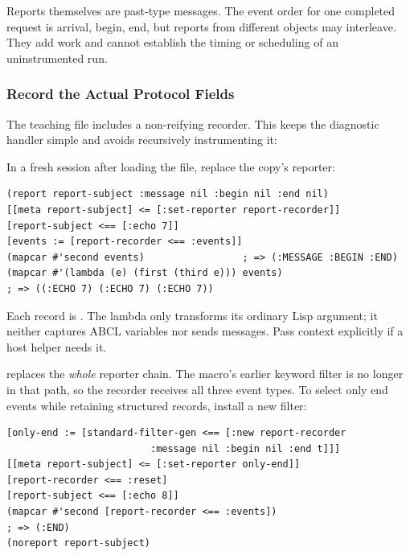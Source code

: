 Reports themselves are past-type messages. The event order for one
completed request is arrival, begin, end, but reports from different
objects may interleave. They add work and cannot establish the timing
or scheduling of an uninstrumented run.

\subsubsection{Record the Actual Protocol Fields}

The teaching file includes a non-reifying recorder. This keeps the
diagnostic handler simple and avoids recursively instrumenting it:


In a fresh session after loading the file, replace the copy's reporter:

\begin{codeblock}
\begin{lstlisting}
(report report-subject :message nil :begin nil :end nil)
[[meta report-subject] <= [:set-reporter report-recorder]]
[report-subject <== [:echo 7]]
[events := [report-recorder <== :events]]
(mapcar #'second events)                 ; => (:MESSAGE :BEGIN :END)
(mapcar #'(lambda (e) (first (third e))) events)
; => ((:ECHO 7) (:ECHO 7) (:ECHO 7))
\end{lstlisting}
\end{codeblock}

Each record is . The lambda only transforms
its ordinary Lisp argument; it neither captures ABCL variables nor sends
messages. Pass context explicitly if a host helper needs it.

 replaces the \emph{whole} reporter chain. The macro's
earlier keyword filter is no longer in that path, so the recorder receives
all three event types. To select only end events while retaining structured
records, install a new filter:

\begin{codeblock}
\begin{lstlisting}
[only-end := [standard-filter-gen <== [:new report-recorder
                         :message nil :begin nil :end t]]]
[[meta report-subject] <= [:set-reporter only-end]]
[report-recorder <== :reset]
[report-subject <== [:echo 8]]
(mapcar #'second [report-recorder <== :events])
; => (:END)
(noreport report-subject)
\end{lstlisting}
\end{codeblock}

